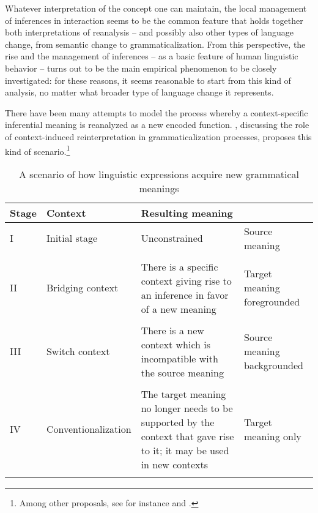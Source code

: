 Whatever interpretation of the concept one can maintain, the local management of inferences in interaction seems to be the common feature that holds together both interpretations of reanalysis – and possibly also other types of language change, from semantic change to grammaticalization. From this perspective, the rise and the management of inferences – as a basic feature of human linguistic behavior – turns out to be the main empirical phenomenon to be closely investigated: for these reasons, it seems reasonable to start from this kind of analysis, no matter what broader type of language change it represents.

There have been many attempts to model the process whereby a context-specific inferential meaning is reanalyzed as a new encoded function. \citet{Heine2002}, discussing the role of context-induced reinterpretation in grammaticalization processes, proposes this kind of scenario.\footnote{Among other proposals, see for instance \citet{Diewald2002} and \citet{Ramat2012}.}


\begin{table}
\begin{tabularx}{\textwidth}{llQQ}
\lsptoprule
Stage & Context & Resulting meaning\\
\midrule
I & Initial stage & Unconstrained & Source meaning\\
\hspace{1mm}\\
II &  Bridging context & There is a specific context giving rise to an inference in favor of a new meaning & Target meaning foregrounded\\
\hspace{1mm}\\
III & Switch context & There is a new context which is incompatible with the source meaning & Source meaning backgrounded\\
\hspace{1mm}\\
IV & Conventionalization & The target meaning no longer needs to be supported by the context that gave rise to it; it may be used in new contexts & Target meaning only\\
\lspbottomrule
\end{tabularx}
\caption{A scenario of how linguistic expressions acquire new grammatical meanings \citep[86]{Heine2002}}
\label{tab:key:4}
\end{table}

